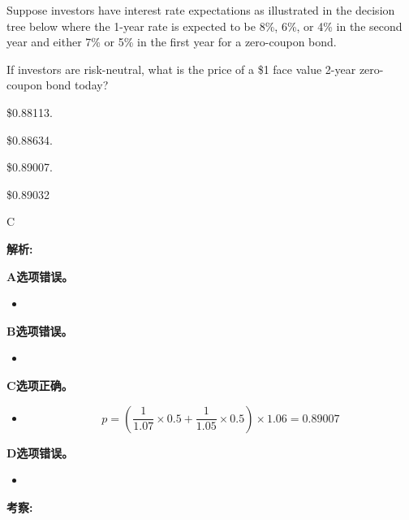 \documentclass{article}
\newcounter{question} %
\newenvironment{explanation}
{\textbf{解析:}\par}
{\par}
\newcommand{\checklist}[1]{
    \textbf{考察:} #1 \par %
    \addcontentsline{toc}{subsection}{题号\thequestion 考察: #1} %
    \vspace{2em} %
}
\begin{document}
\begin{question}
    Suppose investors have interest rate expectations as illustrated in the decision tree below
    where the 1-year rate is expected to be 8\%, 6\%, or 4\% in the second year and either 7\% or 5\% in
    the first year for a zero-coupon bond.



    If investors are risk-neutral, what is the price of a \$1 face value 2-year zero-coupon bond
    today?
\end{question}

\begin{choices}
    \item \$0.88113.
    \item \$0.88634.
    \item \$0.89007.
    \item \$0.89032
\end{choices}

\begin{correctanswer}
    C
\end{correctanswer}

\begin{explanation}
    \textbf{A选项错误。}
    \begin{itemize}
        \item 
    \end{itemize}
    \textbf{B选项错误。}
    \begin{itemize}
        \item 
    \end{itemize}
    \textbf{C选项正确。}
    \begin{itemize}
        \item \[
p = \left( \frac{1}{1.07} \times 0.5 + \frac{1}{1.05} \times 0.5 \right) \times 1.06 = 0.89007
\]
    \end{itemize}
    \textbf{D选项错误。}
    \begin{itemize}
        \item 
    \end{itemize}
\end{explanation}
\checklist{}
\end{document}
